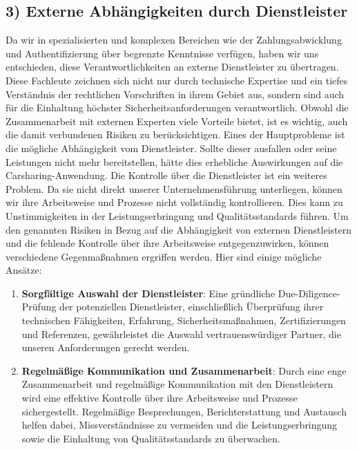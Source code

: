 \subsection*{3) Externe Abhängigkeiten durch Dienstleister}
Da wir in spezialisierten und komplexen Bereichen wie der Zahlungsabwicklung und Authentifizierung über begrenzte Kenntnisse verfügen, haben wir uns entschieden, diese Verantwortlichkeiten an externe Dienstleister zu übertragen.
Diese Fachleute zeichnen sich nicht nur durch technische Expertise und ein tiefes Verständnis der rechtlichen Vorschriften in ihrem Gebiet aus, sondern sind auch für die Einhaltung höchster Sicherheitsanforderungen verantwortlich.
Obwohl die Zusammenarbeit mit externen Experten viele Vorteile bietet, ist es wichtig, auch die damit verbundenen Risiken zu berücksichtigen.
Eines der Hauptprobleme ist die mögliche Abhängigkeit vom Dienstleister.
Sollte dieser ausfallen oder seine Leistungen nicht mehr bereitstellen, hätte dies erhebliche Auswirkungen auf die Carsharing-Anwendung.
Die Kontrolle über die Dienstleister ist ein weiteres Problem.
Da sie nicht direkt unserer Unternehmensführung unterliegen, können wir ihre Arbeitsweise und Prozesse nicht vollständig kontrollieren.
Dies kann zu Unstimmigkeiten in der Leistungserbringung und Qualitätsstandards führen.
Um den genannten Risiken in Bezug auf die Abhängigkeit von externen Dienstleistern und die fehlende Kontrolle über ihre Arbeitsweise entgegenzuwirken, können verschiedene Gegenmaßnahmen ergriffen werden.
Hier sind einige mögliche Ansätze:
\begin{enumerate}
    \item \textbf{Sorgfältige Auswahl der Dienstleister}: Eine gründliche Due-Diligence-Prüfung der potenziellen Dienstleister, einschließlich Überprüfung ihrer technischen Fähigkeiten, Erfahrung, Sicherheitsmaßnahmen, Zertifizierungen und Referenzen, gewährleistet die Auswahl vertrauenswürdiger Partner, die unseren Anforderungen gerecht werden.
    \item \textbf{Regelmäßige Kommunikation und Zusammenarbeit}: Durch eine enge Zusammenarbeit und regelmäßige Kommunikation mit den Dienstleistern wird eine effektive Kontrolle über ihre Arbeitsweise und Prozesse sichergestellt. Regelmäßige Besprechungen, Berichterstattung und Austausch helfen dabei, Missverständnisse zu vermeiden und die Leistungserbringung sowie die Einhaltung von Qualitätsstandards zu überwachen.
\end{enumerate}

